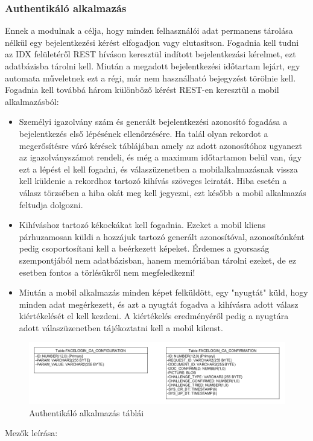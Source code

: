 \subsubsection{Authentikáló alkalmazás}
Ennek a modulnak a célja, hogy minden felhasználói adat permanens tárolása nélkül egy bejelentkezési kérést elfogadjon vagy elutasítson. Fogadnia kell tudni az IDX felületéről REST híváson keresztül indított bejelentkezási kérelmet, ezt adatbázisba tárolni kell. Miután a megadott bejelentkezési időtartam lejárt, egy automata műveletnek ezt a régi, már nem használható bejegyzést törölnie kell.\\
Fogadnia kell továbbá három különböző kérést REST-en keresztül a mobil alkalmazásból:
\begin{itemize}
\item Személyi igazolvány szám és generált bejelentkezési azonosító fogadása a bejelentkezés első lépésének ellenőrzésére. Ha talál olyan rekordot a megerősítésre váró kérések táblájában amely az adott azonosítóhoz ugyanezt az igazolványszámot rendeli, és még a maximum időtartamon belül van, úgy ezt a lépést el kell fogadni, és válaszüzenetben a mobilalkalmazásnak vissza kell küldenie a rekordhoz tartozó kihívás szöveges leiratát. Hiba esetén a válasz törzsében a hiba okát meg kell jegyezni, ezt később a mobil alkalmazás feltudja dolgozni.
\item Kihíváshoz tartozó kékockákat kell fogadnia. Ezeket a mobil kliens párhuzamosan küldi a hozzájuk tartozó generált azonosítóval, azonosítónként pedig csoportosítani kell a beérkezett képeket. Érdemes a gyorsaság szempontjából nem adatbázisban, hanem memóriában tárolni ezeket, de ez esetben fontos a törlésükről nem megfeledkezni!
\item Miután a mobil alkalmazás minden képet felküldött, egy "nyugtát" küld, hogy minden adat megérkezett, és azt a nyugtát fogadva a kihívásra adott válasz kiértékelését el kell kezdeni. A kiértékelés eredményéről pedig a nyugtára adott válaszüzenetben tájékoztatni kell a mobil kilenst.
\end{itemize}

\begin{figure}[h]
 \begin{minipage}{1\textwidth} 
\centering
    \includegraphics[scale=0.4]{img/facelogin_ca_db}
    \caption{Authentikáló alkalmazás táblái}
 \end{minipage}
\end{figure}
Mezők leírása:

